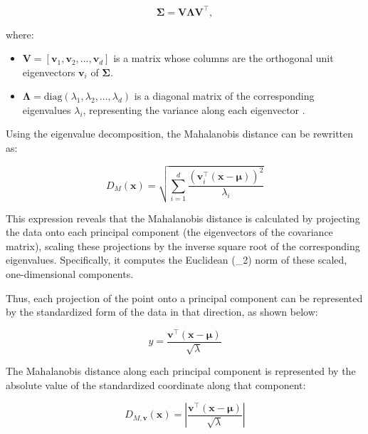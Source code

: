 \begin{equation}
\boldsymbol{\Sigma} = \mathbf{V} \boldsymbol{\Lambda} \mathbf{V}^\top,
\end{equation}

where:
\begin{itemize}
    \item $\mathbf{V} = [\mathbf{v}_1, \mathbf{v}_2, \dots, \mathbf{v}_d]$ is a matrix whose columns are the orthogonal unit eigenvectors $\mathbf{v}_i$ of $\boldsymbol{\Sigma}$.
    \item $\boldsymbol{\Lambda} = \text{diag}(\lambda_1, \lambda_2, \dots, \lambda_d)$ is a diagonal matrix of the corresponding eigenvalues $\lambda_i$, representing the variance along each eigenvector \citep{jolliffe2002principal}.
\end{itemize}

Using the eigenvalue decomposition, the Mahalanobis distance can be rewritten as:

\begin{equation}
\label{eq:mahalanobis_pca}
D_M(\mathbf{x}) = \sqrt{ \sum_{i=1}^d \frac{ (\mathbf{v}_i^\top (\mathbf{x} - \boldsymbol{\mu}))^2 }{ \lambda_i } }
\end{equation}

This expression reveals that the Mahalanobis distance is calculated by projecting the data onto each principal component (the eigenvectors of the covariance matrix), scaling these projections by the inverse square root of the corresponding eigenvalues. Specifically, it computes the Euclidean (\ell_2) norm of these scaled, one-dimensional components. 

Thus, each projection of the point onto a principal component can be represented by the standardized form of the data in that direction, as shown below:

\begin{equation}
    \label{eq:y_definition}
    y = \frac{ \mathbf{v}^\top (\mathbf{x} - \boldsymbol{\mu}) }{ \sqrt{\lambda} }
    \end{equation}

The Mahalanobis distance along each principal component is represented by the absolute value of the standardized coordinate along that component:

\begin{equation}
    \label{eq:single_pc_distance}
    D_{M, \mathbf{v}}(\mathbf{x}) = \left| \frac{ \mathbf{v}^\top (\mathbf{x} - \boldsymbol{\mu}) }{ \sqrt{\lambda} } \right|
    \end{equation}
    

